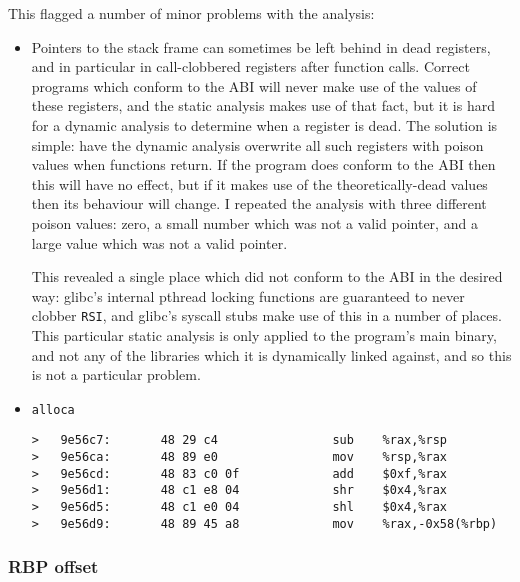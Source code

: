 This flagged a number of minor problems with the analysis:

\begin{itemize}
\item
  Pointers to the stack frame can sometimes be left behind in dead
  registers, and in particular in call-clobbered registers after
  function calls.  Correct programs which conform to the ABI will
  never make use of the values of these registers, and the static
  analysis makes use of that fact, but it is hard for a dynamic
  analysis to determine when a register is dead.  The solution is
  simple: have the dynamic analysis overwrite all such registers with
  poison values when functions return.  If the program does conform to
  the ABI then this will have no effect, but if it makes use of the
  theoretically-dead values then its behaviour will change.  I
  repeated the analysis with three different poison values: zero, a
  small number which was not a valid pointer, and a large value which
  was not a valid pointer.

  This revealed a single place which did not conform to the ABI in the
  desired way: glibc's internal pthread locking functions are
  guaranteed to never clobber \verb|RSI|, and glibc's syscall stubs
  make use of this in a number of places.  This particular static
  analysis is only applied to the program's main binary, and not any
  of the libraries which it is dynamically linked against, and so this
  is not a particular problem.

\item
  \verb|alloca|

\begin{verbatim}
>   9e56c7:       48 29 c4                sub    %rax,%rsp
>   9e56ca:       48 89 e0                mov    %rsp,%rax
>   9e56cd:       48 83 c0 0f             add    $0xf,%rax
>   9e56d1:       48 c1 e8 04             shr    $0x4,%rax
>   9e56d5:       48 c1 e0 04             shl    $0x4,%rax
>   9e56d9:       48 89 45 a8             mov    %rax,-0x58(%rbp)
\end{verbatim}

\end{itemize}

\subsubsection{RBP offset}

